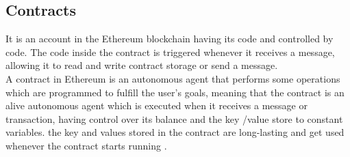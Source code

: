 \subsection{Contracts} 
It is an account in the Ethereum blockchain having its code and controlled by code. The code inside the contract is triggered whenever it receives a message, allowing it to read and write contract storage or send a message. \\
A contract in Ethereum is an autonomous agent that performs some operations which are programmed to fulfill the user's goals, meaning that the contract is an alive autonomous agent which is executed when it receives a message or transaction, having control over its balance and the key /value store to constant variables.
the key and values stored in the contract are long-lasting and get used whenever the contract starts running \cite{Egbertsen}.

